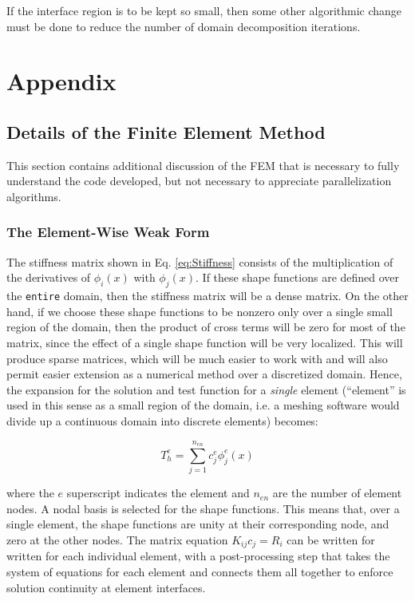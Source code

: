 \documentclass[10pt]{article}
\newcommand{\beq}{\begin{equation}}
\newcommand{\eeq}{\end{equation}}
\begin{document}
If the interface region is to be kept so small, then some other algorithmic change must be done to reduce the number of domain decomposition iterations. 

\section{Appendix}
\subsection{Details of the Finite Element Method}
This section contains additional discussion of the FEM that is necessary to fully understand the code developed, but not necessary to appreciate parallelization algorithms.

\subsubsection{The Element-Wise Weak Form}
The stiffness matrix shown in Eq. \eqref{eq:Stiffness} consists of the multiplication of the derivatives of \(\phi_i(x)\) with \(\phi_j(x)\). If these shape functions are defined over the {\tt entire} domain, then the stiffness matrix will be a dense matrix. On the other hand, if we choose these shape functions to be nonzero only over a single small region of the domain, then the product of cross terms will be zero for most of the matrix, since the effect of a single shape function will be very localized. This will produce sparse matrices, which will be much easier to work with and will also permit easier extension as a numerical method over a discretized domain. Hence, the expansion for the solution and test function for a {\it single} element (``element'' is used in this sense as a small region of the domain, i.e. a meshing software would divide up a continuous domain into discrete elements) becomes:

\beq
T_h^e=\sum_{j=1}^{n_{en}}c_j^e\phi_j^e(x)
\eeq

where the \(e\) superscript indicates the element and \(n_{en}\) are the number of element nodes. A nodal basis is selected for the shape functions. This means that, over a single element, the shape functions are unity at their corresponding node, and zero at the other nodes. The matrix equation \(K_{ij}c_j=R_i\) can be written for written for each individual element, with a post-processing step that takes the system of equations for each element and connects them all together to enforce solution continuity at element interfaces. 
\end{document}
